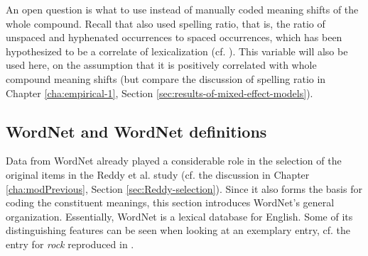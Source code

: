 An open question is what to use instead of manually coded meaning
shifts of the whole compound. 
Recall that \citet{BellandSchaefer:2013}
also used spelling ratio, that is, the ratio of unspaced and hyphenated
occurrences to spaced occurrences, which has been hypothesized to be a
correlate of lexicalization (cf. \citealt[496]{BellandPlag:2012}). 
This variable will also be used here, on the assumption that it is
positively correlated with whole compound meaning shifts (but compare the discussion of spelling ratio in Chapter \ref{cha:empirical-1}, Section \ref{sec:results-of-mixed-effect-models}). 


\subsection*{WordNet and WordNet definitions}
\label{sec:wordnet}

Data from WordNet already played a considerable role in the selection
of the original items in the Reddy et
al. study (cf. the discussion in Chapter \ref{cha:modPrevious},
Section \ref{sec:Reddy-selection}). Since it also forms the basis for
coding the constituent meanings, this section introduces WordNet's general
organization. Essentially, WordNet is a lexical database for
English. Some of its distinguishing features can be seen when looking
at an exemplary entry, cf. the entry for \emph{rock} reproduced in \Next. 

